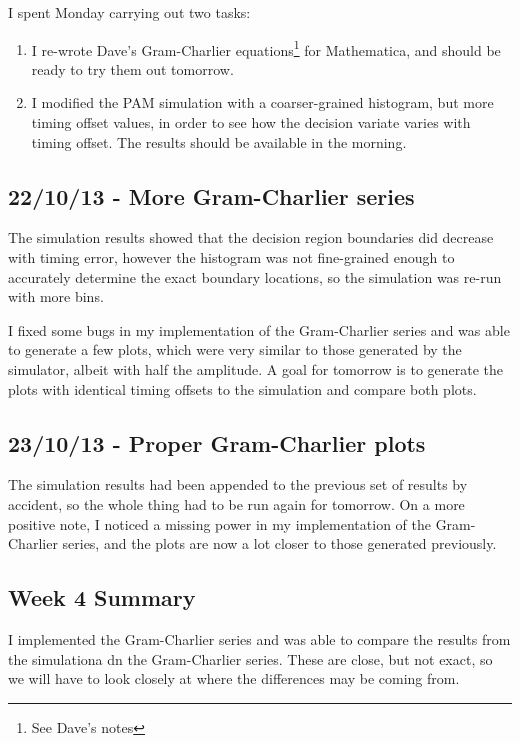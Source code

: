 I spent Monday carrying out two tasks:

\begin{enumerate}
\def\labelenumi{\arabic{enumi}.}
\itemsep1pt\parskip0pt
\item
  I re-wrote Dave's Gram-Charlier equations\footnote{See
    Dave's notes} for Mathematica, and should be ready to try
  them out tomorrow.
\item
  I modified the PAM simulation with a coarser-grained histogram, but
  more timing offset values, in order to see how the decision variate
  varies with timing offset. The results should be available in the
  morning.
\end{enumerate}

\subsection{22/10/13 - More Gram-Charlier series}

The simulation results showed that the decision region boundaries did
decrease with timing error, however the histogram was not fine-grained
enough to accurately determine the exact boundary locations, so the
simulation was re-run with more bins.

I fixed some bugs in my implementation of the Gram-Charlier series and
was able to generate a few plots, which were very similar to those
generated by the simulator, albeit with half the amplitude. A goal for
tomorrow is to generate the plots with identical timing offsets to the
simulation and compare both plots.

\subsection{23/10/13 - Proper Gram-Charlier plots}

The simulation results had been appended to the previous set of results
by accident, so the whole thing had to be run again for tomorrow. On a
more positive note, I noticed a missing power in my implementation of
the Gram-Charlier series, and the plots are now a lot closer to those
generated previously.

\subsection{Week 4 Summary}

I implemented the Gram-Charlier series and was able to compare the
results from the simulationa dn the Gram-Charlier series. These are
close, but not exact, so we will have to look closely at where the
differences may be coming from.

